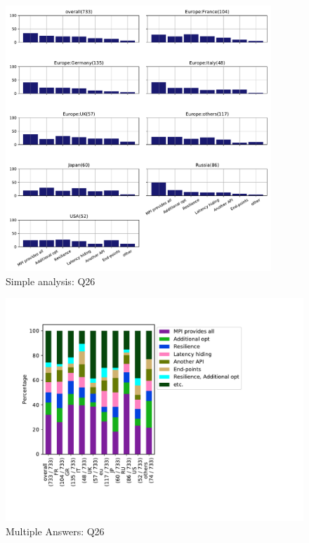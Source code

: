 \begin{figure}[htb]
\begin{center}
\includegraphics[width=10cm]{../pdfs/Q26.pdf}
\caption{Simple analysis: Q26}
\label{fig:Q26}
\end{center}
\end{figure}

\begin{figure}[htb]
\begin{center}
\includegraphics[width=14cm]{../pdfs/Q26-mans.pdf}
\caption{Multiple Answers: Q26}
\label{fig:Q26-mans}
\end{center}
\end{figure}
